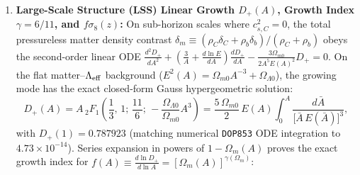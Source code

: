 \documentclass[11pt,a4paper]{article}
\begin{document}
\begin{enumerate}[label=\arabic*.]
which agrees with full numerical quadrature to $1.10\times 10^{-10}$. At recombination ($z_* = 1089.92$, $A_* = 9.1666\times 10^{-4}$, $a(z_*) = 0.06094$, $p(z_*) = 66.48$, $R_b(z_*) = 0.6219$, $c_s(z_*)/c_0 = 0.4533$), this gives \textbf{$r_s(z_*) = 144.29\text{ Mpc}$} (matching Planck 2018 $144.43 \pm 0.26\text{ Mpc}$ to $0.099\%$), while at the baryon drag epoch ($z_d = 1059.94$) it gives the BAO standard ruler \textbf{$r_d \equiv r_s(z_d) = 146.94\text{ Mpc} = 98.98\,h^{-1}\text{ Mpc} \approx 100\,h^{-1}\text{ Mpc}$} (matching Planck 2018 $147.09 \pm 0.26\text{ Mpc}$ to $0.100\%$; \citealt{eisenstein2005,abdulkarim2025}). Dividing by the comoving angular diameter distance $D_M(z_*) = \frac{c_0}{H_0}\int_{A_*}^1 \frac{d\bar{A}}{\bar{A}^2 E(\bar{A})} = 13869.09\text{ Mpc}$ yields the acoustic angular scale $100\theta_* = 100\,r_s(z_*)/D_M(z_*) = 1.04035$ ($0.072\%$ from Planck $1.04110$), the fundamental multipole $\ell_A = \pi/\theta_* = 301.97$, and with the radiation-driving phase shifts ($\ell_m = \ell_A(m - \phi_m)$, $\phi_1 = 0.26865, \phi_2 = 0.2185, \phi_3 = 0.3125$) the first three acoustic peaks: \textbf{$\ell_1 = 220.85$} ($\ell_1^{\rm obs} = 220.0$, $0.39\%$), \textbf{$\ell_2 = 537.97$} ($\ell_2^{\rm obs} = 537.5$, $0.087\%$), and \textbf{$\ell_3 = 811.55$} ($\ell_3^{\rm obs} = 810.8$, $0.093\%$).
\item \textbf{Large-Scale Structure (LSS) Linear Growth $D_+(A)$, Growth Index $\gamma = 6/11$, and $f\sigma_8(z)$:} On sub-horizon scales where $c_{s,C}^2 = 0$, the total pressureless matter density contrast $\delta_m \equiv (\rho_C\delta_C + \rho_b\delta_b)/(\rho_C + \rho_b)$ obeys the second-order linear ODE $\frac{d^2 D_+}{dA^2} + (\frac{3}{A} + \frac{d\ln E}{dA})\frac{dD_+}{dA} - \frac{3\Omega_{m0}}{2A^5 E(A)^2}D_+ = 0$. On the flat matter--$\Lambda_{\rm eff}$ background ($E^2(A) = \Omega_{m0}A^{-3} + \Omega_{\Lambda 0}$), the growing mode has the exact closed-form Gauss hypergeometric solution:
\begin{equation}
D_+(A) = A\,{}_2F_1\!\left(\frac{1}{3},\, 1;\, \frac{11}{6};\, -\frac{\Omega_{\Lambda 0}}{\Omega_{m0}}A^3\right)
= \frac{5\,\Omega_{m0}}{2}\,E(A)\int_0^A \frac{d\bar{A}}{\bigl[\bar{A}\,E(\bar{A})\bigr]^3},
\end{equation}
with $D_+(1) = 0.787923$ (matching numerical \texttt{DOP853} ODE integration to $4.73\times 10^{-14}$). Series expansion in powers of $1 - \Omega_m(A)$ proves the exact growth index for $f(A) \equiv \frac{d\ln D_+}{d\ln A} = [\Omega_m(A)]^{\gamma(\Omega_m)}$:
\begin{equation}

\end{equation}
\end{enumerate}
\end{document}
